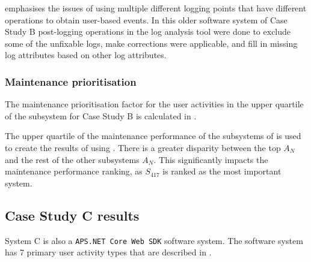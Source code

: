  emphasises the issues of using multiple different logging points that have different operations to obtain user-based events. In this older software system of Case Study B post-logging operations in the log analysis tool were done to exclude some of the unfixable logs, make corrections were applicable, and fill in missing log attributes based on other log attributes.

\subsubsection{Maintenance prioritisation}
The maintenance prioritisation factor for the user activities in the upper quartile of the subsystem for Case Study B is calculated in .

\clearpage



The upper quartile of the maintenance performance of the subsystems of  is used to create the results of  using . There is a greater disparity between the top $A_N$ and the rest of the other subsystems $A_N$. This significantly impacts the maintenance performance ranking, as $S_{417}$ is ranked as the most important system.

\subsection{Case Study C results}\label{sec:ch3_csC}
System C is also a \texttt{APS.NET Core Web SDK} software system. The software system has 7 primary user activity types that are described in .

